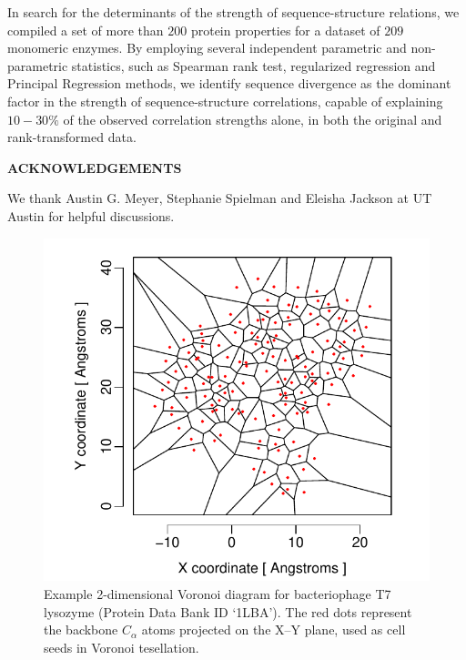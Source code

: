 \documentclass[11pt]{article}
\def\Acknowledgements{\bigskip  \bigskip \begin{center} \begin{large}
             \bf ACKNOWLEDGEMENTS \end{large}\end{center}}
\begin{document}
        In search for the determinants of the strength of sequence-structure relations, we compiled a set of more than $200$ protein properties for a dataset of $209$ monomeric enzymes. By employing several independent parametric and non-parametric statistics, such as Spearman rank test, regularized regression and Principal Regression methods, we identify sequence divergence as the dominant factor in the strength of sequence-structure correlations, capable of explaining $10-30\%$ of the observed correlation strengths alone, in both the original and rank-transformed data.


\Acknowledgements

We thank Austin G. Meyer, Stephanie Spielman and Eleisha Jackson at UT Austin for helpful discussions.





    \begin{figure}[tbh]
        \begin{center}
        \includegraphics[width=6.9in]{voronoi_diagram.pdf}
        \end{center}
        \caption{Example 2-dimensional Voronoi diagram for bacteriophage T7 lysozyme (Protein Data Bank ID `1LBA'). The red dots represent the backbone $C_\alpha$ atoms projected on the X--Y plane, used as cell seeds in Voronoi tesellation.}
        \label{fig:voronoi}
    \end{figure}
\end{document}
